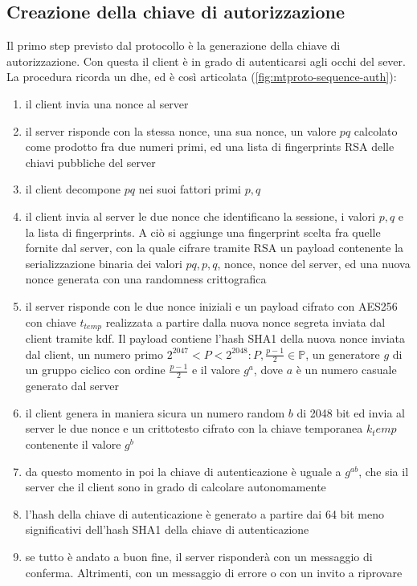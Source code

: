 \subsection{Creazione della chiave di autorizzazione}
Il primo step previsto dal protocollo è la generazione della chiave di autorizzazione.
Con questa il client è in grado di autenticarsi agli occhi del sever. \\
La procedura ricorda un \gls{dhe}, ed è così articolata (\autoref{fig:mtproto-sequence-auth}):
\begin{enumerate}
    \item il client invia una nonce al server
    \item il server risponde con la stessa nonce, una sua nonce, un valore $pq$ calcolato come prodotto fra due numeri primi,
          ed una lista di fingerprints RSA delle chiavi pubbliche del server
    \item il client decompone $pq$ nei suoi fattori primi $p, q$
    \item il client invia al server le due nonce che identificano la sessione, i valori $p, q$ e la lista di fingerprints.
          A ciò si aggiunge una fingerprint scelta fra quelle fornite dal server, con la quale cifrare tramite RSA un payload contenente
          la serializzazione binaria dei valori $pq, p, q$, nonce, nonce del server, ed una nuova nonce generata con una randomness crittografica
    \item il server risponde con le due nonce iniziali e un payload cifrato con AES256 con chiave $t_{temp}$ realizzata a partire dalla nuova nonce segreta inviata dal client tramite \gls{kdf}.
          Il payload contiene l'hash SHA1 della nuova nonce inviata dal client,
          un numero primo $2^{2047} < P < 2^{2048} : P, \frac{p-1}{2} \in \mathbb{P}$, un generatore $g$ di un gruppo ciclico con ordine $\frac{p-1}{2}$ e il valore $g^a$,
          dove $a$ è un numero casuale generato dal server
    \item il client genera in maniera sicura un numero random $b$ di 2048 bit ed invia al server le due nonce e un crittotesto
          cifrato con la chiave temporanea ${k_temp}$ contenente il valore $g^b$
    \item da questo momento in poi la chiave di autenticazione è uguale a $g^{ab}$, che sia il server che il client sono in grado di calcolare autonomamente
    \item l'hash della chiave di autenticazione è generato a partire dai 64 bit meno significativi dell'hash SHA1 della chiave di autenticazione
    \item se tutto è andato a buon fine, il server risponderà con un messaggio di conferma. Altrimenti, con un messaggio di errore o con un invito a riprovare
\end{enumerate}


